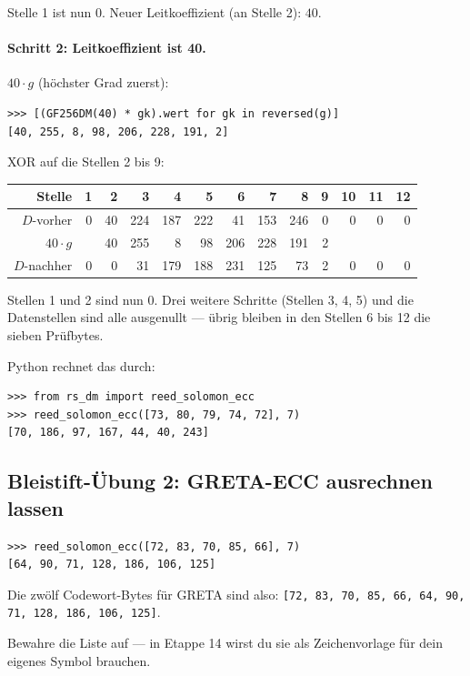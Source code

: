 Stelle 1 ist nun $0$. Neuer Leitkoeffizient (an Stelle 2): $40$.

\paragraph{Schritt 2: Leitkoeffizient ist 40.}
$40 \cdot g$ (höchster Grad zuerst):

\begin{verbatim}
>>> [(GF256DM(40) * gk).wert for gk in reversed(g)]
[40, 255, 8, 98, 206, 228, 191, 2]
\end{verbatim}

XOR auf die Stellen 2 bis 9:

\begin{center}
\small
\begin{tabular}{r r r r r r r r r r r r r}
\toprule
Stelle & 1 & 2 & 3 & 4 & 5 & 6 & 7 & 8 & 9 & 10 & 11 & 12 \\
\midrule
$D$-vorher  & 0 &  40 & 224 & 187 & 222 &  41 & 153 & 246 &   0 &   0 &   0 &   0 \\
$40 \cdot g$&   &  40 & 255 &   8 &  98 & 206 & 228 & 191 &   2 &     &     &     \\
$D$-nachher & 0 &   0 &  31 & 179 & 188 & 231 & 125 &  73 &   2 &   0 &   0 &   0 \\
\bottomrule
\end{tabular}
\end{center}

Stellen 1 und 2 sind nun $0$. Drei weitere Schritte (Stellen 3, 4, 5)
und die Datenstellen sind alle ausgenullt — übrig bleiben in den
Stellen 6 bis 12 die sieben Prüfbytes.

Python rechnet das durch:

\begin{verbatim}
>>> from rs_dm import reed_solomon_ecc
>>> reed_solomon_ecc([73, 80, 79, 74, 72], 7)
[70, 186, 97, 167, 44, 40, 243]
\end{verbatim}

\subsection*{Bleistift-Übung 2: GRETA-ECC ausrechnen lassen}

\begin{verbatim}
>>> reed_solomon_ecc([72, 83, 70, 85, 66], 7)
[64, 90, 71, 128, 186, 106, 125]
\end{verbatim}

Die zwölf Codewort-Bytes für GRETA sind also:
\texttt{[72, 83, 70, 85, 66, 64, 90, 71, 128, 186, 106, 125]}.

Bewahre die Liste auf — in Etappe 14 wirst du sie als Zeichenvorlage
für dein eigenes Symbol brauchen.
